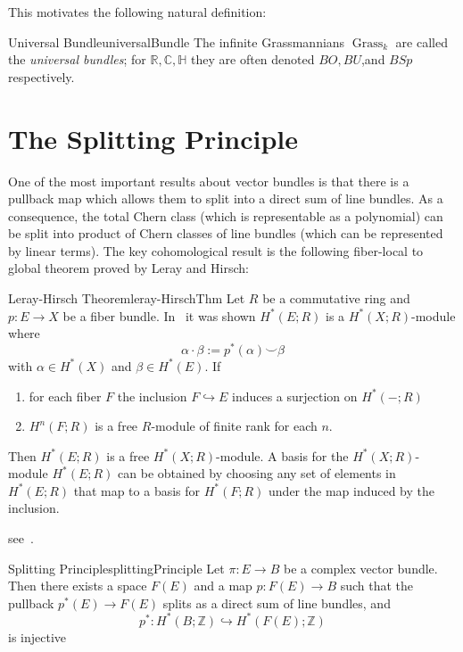 \documentclass{book}
\newenvironment{Proof}[1][]
  {\begin{ProofTcb}[#1]}
  {\end{ProofTcb}}
\newcommand{\R}{{\mathbb{R}}}
\newcommand{\Z}{{\mathbb{Z}}}
\newcommand{\C}{{\mathbb{C}}}
\renewcommand{\H}{{\mathbb{H}}}
\newcommand{\Grass}{{\operatorname{Grass}}}
\begin{document}
\begin{Proof}
  \cite[section~1.2]{NateKTheory}
\end{Proof}

This motivates the following natural definition:

\begin{defn}{Universal Bundle}{universalBundle}
  The infinite Grassmannians $\Grass_{k}$ are called the \emph{universal bundles}; for $\R, \C, \H$ they are often
	denoted $BO, BU$,and $BSp$ respectively.
\end{defn}

\section{The Splitting Principle}

One of the most important results about vector bundles is that there is a pullback map which allows them to split
into a direct sum of line bundles. As a consequence, the total Chern class (which is representable as
a polynomial) can be split into product of Chern classes of line bundles (which can be represented by linear
terms). The key cohomological result is the following fiber-local to global theorem proved by Leray and
Hirsch:

\begin{thm}{Leray-Hirsch Theorem}{leray-HirschThm}
	Let $R$ be a commutative ring and $p: E \to X$ be a fiber bundle. In~\cite{NateAlgTop} it was shown $H^*(E;R)$
	is a $H^*(X;R)$-module where
	\[
		\alpha\cdot \beta := p^*(\alpha)\smile \beta
	\]
	with $\alpha \in H^*(X)$ and $\beta \in H^*(E)$. If
	\begin{enumerate}
		\item for each fiber $F$ the inclusion $F \hookrightarrow E$ induces a surjection on $H^*(-;R)$
		\item $H^n(F;R)$ is a free $R$-module of finite rank for each $n$.
	\end{enumerate}
	Then $H^*(E;R)$ is a free $H^*(X;R)$-module. A basis for the $H^*(X;R)$-module $H^*(E;R)$ can be obtained
	by choosing any set of elements in $H^*(E;R)$ that map to a basis for $H^*(F;R)$ under the map induced by
	the inclusion.
\end{thm}

\begin{Proof}
	see~\cite{NateAlgTop}.
\end{Proof}


\begin{thm}{Splitting Principle}{splittingPrinciple}
	Let $\pi: E \to B$ be a complex vector bundle. Then there exists a space $F(E)$ and a map $p: F(E) \to B$ such
	that the pullback $p^*(E) \to F(E)$ splits as a direct sum of line bundles, and
	\[
		p^*: H^*(B; \Z) \hookrightarrow H^*(F(E); \Z)
	\]
	is injective
\end{thm}
\end{document}
